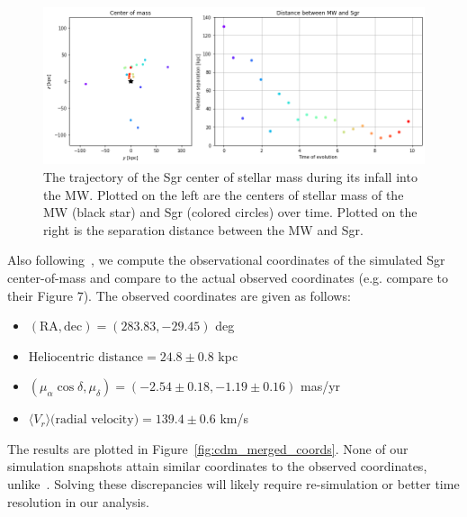 \begin{figure}[h!]
    \centering
    \includegraphics[width=0.9\linewidth]{fig/cdm/merged_trajectory.png}
    \caption{
        The trajectory of the Sgr center of stellar mass during its infall into
        the MW. Plotted on the left are the centers of stellar mass of the MW
        (black star) and Sgr (colored circles) over time. Plotted on the right
        is the separation distance between the MW and Sgr. 
    }
    \label{fig:cdm_merged_sgr}
\end{figure}

Also following~\cite{dierickx_predicted_2017}, we compute the observational
coordinates of the simulated Sgr center-of-mass and compare to the actual
observed coordinates (e.g. compare to their Figure 7). The observed
coordinates are given as follows:

\begin{itemize}
    \item $(\text{RA}, \text{dec}) = (283.83, -29.45)$
    deg~\cite{nasa_nasaipac_nodate}
    \item $\text{Heliocentric distance} = 24.8 \pm 0.8$
    kpc~\cite{kunder_distance_2009}
    \item $(\mu_{\alpha} \cos\delta, \mu_{\delta}) = (-2.54 \pm 0.18, -1.19 \pm 0.16)$ mas/yr~\cite{massari_hubble_2013}
    \item $\langle V_r \rangle \text{(radial velocity)} = 139.4 \pm 0.6$ km/s~\cite{bellazzini_nucleus_2008}
\end{itemize}

The results are plotted in Figure~\ref{fig:cdm_merged_coords}.
None of our simulation snapshots attain similar coordinates to the observed
coordinates, unlike~\cite{dierickx_predicted_2017}. Solving these
discrepancies will likely require re-simulation or better time resolution in
our analysis.

